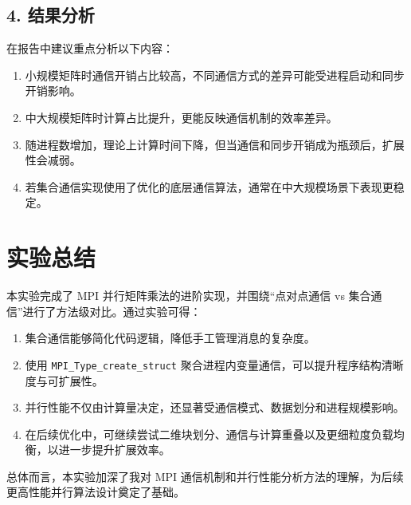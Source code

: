 \documentclass[12pt,a4paper]{ctexart}
\begin{document}
\subsection*{4. 结果分析}
在报告中建议重点分析以下内容：
\begin{enumerate}[itemsep=0.3em]
  \item 小规模矩阵时通信开销占比较高，不同通信方式的差异可能受进程启动和同步开销影响。
  \item 中大规模矩阵时计算占比提升，更能反映通信机制的效率差异。
  \item 随进程数增加，理论上计算时间下降，但当通信和同步开销成为瓶颈后，扩展性会减弱。
  \item 若集合通信实现使用了优化的底层通信算法，通常在中大规模场景下表现更稳定。
\end{enumerate}

\section{实验总结}
本实验完成了 MPI 并行矩阵乘法的进阶实现，并围绕“点对点通信 vs 集合通信”进行了方法级对比。通过实验可得：
\begin{enumerate}[itemsep=0.3em]
  \item 集合通信能够简化代码逻辑，降低手工管理消息的复杂度。
  \item 使用 \texttt{MPI\_Type\_create\_struct} 聚合进程内变量通信，可以提升程序结构清晰度与可扩展性。
  \item 并行性能不仅由计算量决定，还显著受通信模式、数据划分和进程规模影响。
  \item 在后续优化中，可继续尝试二维块划分、通信与计算重叠以及更细粒度负载均衡，以进一步提升扩展效率。
\end{enumerate}

总体而言，本实验加深了我对 MPI 通信机制和并行性能分析方法的理解，为后续更高性能并行算法设计奠定了基础。
\end{document}
